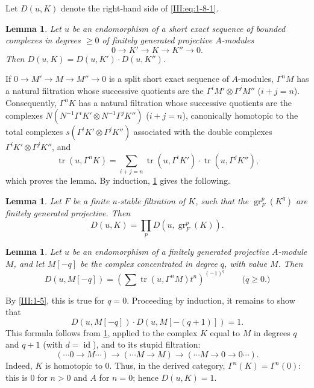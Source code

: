 \documentclass[12pt,oneside,english]{smfbook}
\DeclareMathOperator{\gr}{gr}
\DeclareMathOperator{\tr}{tr}
\newtheorem{lemma_}[subsection]{Lemma}
\begin{document}
Let $D(u,K)$ denote the right-hand side of \eqref{III:eq:1-8-1}.

\begin{lemma_}\label{III:1-9}
Let $u$ be an endomorphism of a short exact sequence of bounded complexes in degrees $\geqslant0$ of finitely generated projective $A$-modules
\[
  0 \to K' \to K \to K'' \to 0 \text{.}
\]
Then $D(u,K)=D(u,K')\cdot D(u,K'')$.
\end{lemma_}

If $0\to M'\to M\to M''\to0$ is a split short exact sequence of $A$-modules, $\Gamma^nM$ has a natural filtration whose successive quotients are the $\Gamma^iM'\otimes\Gamma^jM''$ ($i+j=n$). Consequently, $\Gamma^nK$ has a natural filtration whose successive quotients are the complexes $N(N^{-1}\Gamma^iK'\otimes N^{-1}\Gamma^jK'')$ ($i+j=n$), canonically homotopic to the total complexes $s(\Gamma^iK'\otimes\Gamma^jK'')$ associated with the double complexes $\Gamma^iK'\otimes\Gamma^jK''$, and
\[
  \tr(u,\Gamma^n K) = \sum_{i+j=n} \tr(u,\Gamma^i K')\cdot \tr(u,\Gamma^j K'') \text{,}
\]
which proves the lemma. By induction, \ref{III:1-9} gives the following.

\begin{lemma_}\label{III:1-10}
Let $F$ be a finite $u$-stable filtration of $K$, such that the $\gr_F^p(K^q)$ are finitely generated projective. Then
\[
  D(u,K) = \prod_p D\left(u,\gr_F^p(K)\right) \text{.}
\]
\end{lemma_}

\begin{lemma_}\label{III:1-11}
Let $u$ be an endomorphism of a finitely generated projective $A$-module $M$, and let $M[-q]$ be the complex concentrated in degree $q$, with value $M$. Then
\[
  D\left(u,M[-q]\right) = \left(\sum \tr(u,\Gamma^n M) t^n\right)^{(-1)^q} \qquad \text{($q\geqslant 0$.)}
\]
\end{lemma_}

By \ref{III:1-5}, this is true for $q=0$. Proceeding by induction, it remains to show that
\[
  D\left(u,M[-q]\right) \cdot D\left(u,M[-(q+1)]\right) = 1 \text{.}
\]
This formula follows from \ref{III:1-9}, applied to the complex $K$ equal to $M$ in degrees $q$ and $q+1$ (with $d=\operatorname{id}$), and to its stupid filtration:
\[
  (\cdots 0 \to M \cdots) \to (\cdots M \to M) \to (\cdots M \to 0 \to 0 \cdots) \text{.}
\]
Indeed, $K$ is homotopic to $0$. Thus, in the derived category, $\Gamma^n(K)=\Gamma^n(0)$: this is $0$ for $n>0$ and $A$ for $n=0$; hence $D(u,K)=1$.
\end{document}
